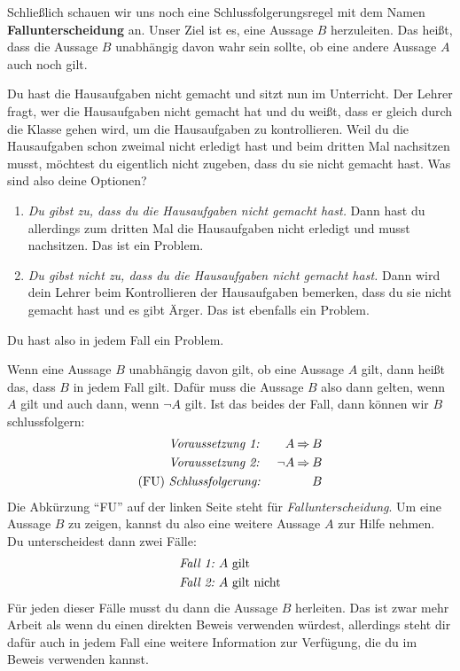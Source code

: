 \documentclass[../../main.tex]{subfiles}
\begin{document}
Schließlich schauen wir uns noch eine Schlussfolgerungsregel mit dem Namen \textbf{Fallunterscheidung} an. Unser Ziel ist es, eine Aussage $B$ herzuleiten. Das heißt, dass die Aussage $B$ unabhängig davon wahr sein sollte, ob eine andere Aussage $A$ auch noch gilt.

\begin{example}{}
    Du hast die Hausaufgaben nicht gemacht und sitzt nun im Unterricht. Der Lehrer fragt, wer die Hausaufgaben nicht gemacht hat und du weißt, dass er gleich durch die Klasse gehen wird, um die Hausaufgaben zu kontrollieren. Weil du die Hausaufgaben schon zweimal nicht erledigt hast und beim dritten Mal nachsitzen musst, möchtest du eigentlich nicht zugeben, dass du sie nicht gemacht hast. Was sind also deine Optionen?
    \begin{enumerate}
        \item \emph{Du gibst zu, dass du die Hausaufgaben nicht gemacht hast.} Dann hast du allerdings zum dritten Mal die Hausaufgaben nicht erledigt und musst nachsitzen. Das ist ein Problem.
        \item \emph{Du gibst nicht zu, dass du die Hausaufgaben nicht gemacht hast.} Dann wird dein Lehrer beim Kontrollieren der Hausaufgaben bemerken, dass du sie nicht gemacht hast und es gibt Ärger. Das ist ebenfalls ein Problem.
    \end{enumerate}
    Du hast also in jedem Fall ein Problem.
\end{example}

Wenn eine Aussage $B$ unabhängig davon gilt, ob eine Aussage $A$ gilt, dann heißt das, dass $B$ in jedem Fall gilt. Dafür muss die Aussage $B$ also dann gelten, wenn $A$ gilt und auch dann, wenn $\lnot A$ gilt. Ist das beides der Fall, dann können wir $B$ schlussfolgern:
\begin{align*}
    &\text{\emph{Voraussetzung~1:}}~&A \mathbin{\Rightarrow} B\\
    &\text{\emph{Voraussetzung~2:}}~&\lnot A \mathbin{\Rightarrow} B\\
    \text{(FU)}~&\text{\emph{Schlussfolgerung:}}~&B
\end{align*}
Die Abkürzung \enquote{FU} auf der linken Seite steht für \emph{Fallunterscheidung}. Um eine Aussage $B$ zu zeigen, kannst du also eine weitere Aussage $A$ zur Hilfe nehmen. Du unterscheidest dann zwei Fälle:
\begin{align*}
    \text{\emph{Fall~1:}}~&A~\text{gilt}\\
    \text{\emph{Fall~2:}}~&A~\text{gilt nicht}
\end{align*}
Für jeden dieser Fälle musst du dann die Aussage $B$ herleiten. Das ist zwar mehr Arbeit als wenn du einen direkten Beweis verwenden würdest, allerdings steht dir dafür auch in jedem Fall eine weitere Information zur Verfügung, die du im Beweis verwenden kannst.
\end{document}
